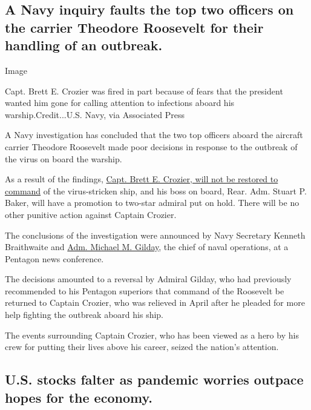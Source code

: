 \hypertarget{a-navy-inquiry-faults-the-top-two-officers-on-the-carrier-theodore-roosevelt-for-their-handling-of-an-outbreak}{%
\subsection{A Navy inquiry faults the top two officers on the carrier
Theodore Roosevelt for their handling of an
outbreak.}\label{a-navy-inquiry-faults-the-top-two-officers-on-the-carrier-theodore-roosevelt-for-their-handling-of-an-outbreak}}

Image

Capt. Brett E. Crozier was fired in part because of fears that the
president wanted him gone for calling attention to infections aboard his
warship.Credit...U.S. Navy, via Associated Press

A Navy investigation has concluded that the two top officers aboard the
aircraft carrier Theodore Roosevelt made poor decisions in response to
the outbreak of the virus on board the warship.

As a result of the findings,
\href{https://www.nytimes.com/2020/06/19/us/politics/carrier-roosevelt-coronavirus-crozier.html}{Capt.
Brett E. Crozier, will not be restored to command} of the virus-stricken
ship, and his boss on board, Rear. Adm. Stuart P. Baker, will have a
promotion to two-star admiral put on hold. There will be no other
punitive action against Captain Crozier.

The conclusions of the investigation were announced by Navy Secretary
Kenneth Braithwaite and
\href{https://www.nytimes.com/2020/05/01/us/politics/coronavirus-carrier-crozier-gilday-trump.html}{Adm.
Michael M. Gilday}, the chief of naval operations, at a Pentagon news
conference.

The decisions amounted to a reversal by Admiral Gilday, who had
previously recommended to his Pentagon superiors that command of the
Roosevelt be returned to Captain Crozier, who was relieved in April
after he pleaded for more help fighting the outbreak aboard his ship.

The events surrounding Captain Crozier, who has been viewed as a hero by
his crew for putting their lives above his career, seized the nation's
attention.

\hypertarget{us-stocks-falter-as-pandemic-worries-outpace-hopes-for-the-economy}{%
\subsection{U.S. stocks falter as pandemic worries outpace hopes for the
economy.}\label{us-stocks-falter-as-pandemic-worries-outpace-hopes-for-the-economy}}


